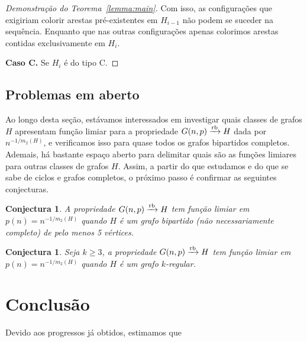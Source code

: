 \documentclass[12pt,a4paper]{book}
\newcommand{\K}{K_{\ell,r}} %
\def\rbarrow{\xrightarrow[]{\raisebox{0.0mm}[0mm]{$\scriptstyle \rm rb$}}}
\newtheorem{conjectura}[teorema] {Conjectura}
\begin{document}
\begin{proof}[Demonstração do Teorema~\ref{lemma:main}]
 
        Com isso, as configurações que exigiriam colorir arestas pré-existentes em $H_{i-1}$ não podem se suceder na sequência.
        Enquanto que nas outras configurações apenas colorimos arestas contidas exclusivamente em $H_{i}$.

        \medskip \textbf{Caso C.} Se $H_i$ é do tipo C.
     \end{proof}
 
  
  
\section{Problemas em aberto}
\label{subsec:bipartido-prob}
Ao longo desta seção, estávamos interessados em investigar quais classes de grafos $H$ apresentam função limiar para a propriedade $G(n,p)\rbarrow H$  dada por $n^{-1/m_2(H)}$, 
e verificamos isso para quase todos os grafos bipartidos completos.
Ademais, há bastante espaço aberto para delimitar quais são as funções limiares para outras classes de grafos $H$. 
Assim, a partir do que estudamos e do que se sabe de ciclos e grafos completos, o próximo passo é confirmar as seguintes conjecturas. %



\begin{conjectura}\label{conj:antibipartidos}
     A propriedade $G(n,p)\rbarrow H$ tem função limiar em  $p(n) =  n^{-1/m_2(H)}$ quando $H$ é um grafo bipartido (não necessariamente completo) de pelo menos 5 vértices.
\end{conjectura}

\begin{conjectura}\label{conj:antiregulares}
     Seja $k \geq 3$, a propriedade $G(n,p)\rbarrow H$ tem função limiar em  $p(n) =  n^{-1/m_2(H)}$ quando $H$ é um grafo $k$-regular.
\end{conjectura}

\chapter{Conclusão}
\label{sec:conclusao}

Devido aos progressos já obtidos, estimamos que 
































\backmatter \singlespacing   %
\end{document}
